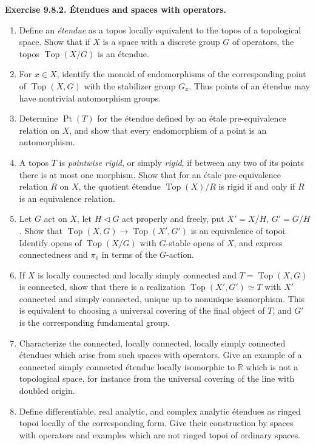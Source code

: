 \documentclass[11pt]{article}
\newcommand{\Top}{\operatorname{Top}}
\newcommand{\Ppoint}{\operatorname{Pt}}
\newenvironment{remarktext}[1]{\par\medskip\noindent\textbf{#1.}\ }{\par\medskip}
\begin{document}
\begin{remarktext}{Exercise 9.8.2. \'Etendues and spaces with operators}
\begin{enumerate}[label=\alph*)]
\item Define an \emph{\'etendue} as a topos locally equivalent to the topos of a topological space. Show that if \(X\) is a space with a discrete group \(G\) of operators, the topos \(\Top(X/G)\) is an \'etendue.
\item For \(x\in X\), identify the monoid of endomorphisms of the corresponding point of \(\Top(X,G)\) with the stabilizer group \(G_x\). Thus points of an \'etendue may have nontrivial automorphism groups.
\item Determine \(\Ppoint(T)\) for the \'etendue defined by an \'etale pre-equivalence relation on \(X\), and show that every endomorphism of a point is an automorphism.
\item A topos \(T\) is \emph{pointwise rigid}, or simply \emph{rigid}, if between any two of its points there is at most one morphism. Show that for an \'etale pre-equivalence relation \(R\) on \(X\), the quotient \'etendue \(\Top(X)/R\) is rigid if and only if \(R\) is an equivalence relation.
\item Let \(G\) act on \(X\), let \(H\triangleleft G\) act properly and freely, put \(X'=X/H\), \(G'=G/H\). Show that \(\Top(X,G)\to\Top(X',G')\) is an equivalence of topoi. Identify opens of \(\Top(X/G)\) with \(G\)-stable opens of \(X\), and express connectedness and \(\pi_0\) in terms of the \(G\)-action.
\item If \(X\) is locally connected and locally simply connected and \(T=\Top(X,G)\) is connected, show that there is a realization \(\Top(X',G')\simeq T\) with \(X'\) connected and simply connected, unique up to nonunique isomorphism. This is equivalent to choosing a universal covering of the final object of \(T\), and \(G'\) is the corresponding fundamental group.
\item Characterize the connected, locally connected, locally simply connected \'etendues which arise from such spaces with operators. Give an example of a connected simply connected \'etendue locally isomorphic to \(\mathbb R\) which is not a topological space, for instance from the universal covering of the line with doubled origin.
\item Define differentiable, real analytic, and complex analytic \'etendues as ringed topoi locally of the corresponding form. Give their construction by spaces with operators and examples which are not ringed topoi of ordinary spaces.
\end{enumerate}
\end{remarktext}
\end{document}
